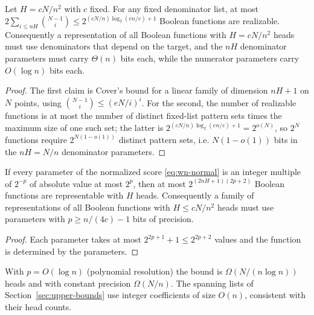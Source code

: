 \begin{proposition}
\label{prop:wn-information}
Let $H=cN/n^2$ with $c$ fixed. For any fixed denominator list, at most
$2\sum_{i\le nH}\binom{N-1}i\le 2^{(cN/n)\log_2(en/c)+1}$ Boolean
functions are realizable. Consequently a representation of all Boolean
functions with $H=cN/n^2$ heads must use denominators that depend on
the target, and the $nH$ denominator parameters must carry $\Theta(n)$
bits each, while the numerator parameters carry $O(\log n)$ bits each.
\end{proposition}
\begin{proof}
The first claim is Cover's bound for a linear family of dimension
$nH+1$ on $N$ points, using $\binom{N-1}{i}\le(eN/i)^i$. For the second,
the number of realizable functions is at most the number of distinct
fixed-list pattern sets times the maximum size of one such set; the
latter is $2^{(cN/n)\log_2(en/c)+1}=2^{o(N)}$, so $2^{N}$ functions
require $2^{N(1-o(1))}$ distinct pattern sets, i.e. $N(1-o(1))$ bits
in the $nH=N/n$ denominator parameters.
\end{proof}


\begin{proposition}
\label{prop:wn-precision}
If every parameter of the normalized score \eqref{eq:wn-normal} is an
integer multiple of $2^{-p}$ of absolute value at most $2^p$, then at
most $2^{(2nH+1)(2p+2)}$ Boolean functions are representable with $H$
heads. Consequently a family of representations of all Boolean
functions with $H\le cN/n^2$ heads must use parameters with
$p\ge n/(4c)-1$ bits of precision.
\end{proposition}
\begin{proof}
Each parameter takes at most $2^{2p+1}+1\le2^{2p+2}$ values and the
function is determined by the parameters.
\end{proof}
With $p=O(\log n)$ (polynomial resolution) the bound is
$\Omega(N/(n\log n))$ heads and with constant precision $\Omega(N/n)$.
The spanning lists of Section~\ref{sec:upper-bounds} use integer
coefficients of size $O(n)$, consistent with their head counts.

